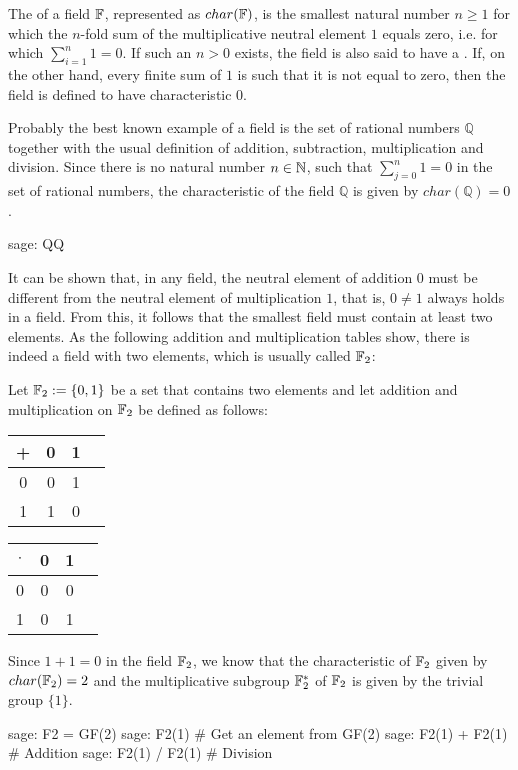 The  of a field $ \mathbb{F} $, represented as $char(\mathbb{F})$, is the smallest natural number $ n \geq 1 $ for which the $n$-fold sum of the multiplicative neutral element  $ 1 $ equals zero, i.e. for which $ \sum_{i = 1} ^ n 1 = 0 $. If such an $ n> 0 $ exists, the field is also said to have a . If, on the other hand, every finite sum of $1$ is such that it is not equal to zero, then the field is defined to have characteristic $ 0 $. 
\begin{example} Probably the best known example of a field is the set of rational numbers $\mathbb{Q}$ together with the usual definition of addition, subtraction, multiplication and division. Since there is no natural number $n\in \mathbb{N}$, such that $\sum_{j=0}^n 1 =0$ in the set of rational numbers, the characteristic of the field $\mathbb{Q}$ is given by $char(\mathbb{Q})=0$. 
\begin{sagecommandline}
sage: QQ
\end{sagecommandline}
\end{example}
\begin{example}\label{ex:field-2-elements} It can be shown that, in any field, the neutral element of addition $0$ must be different from the neutral element of multiplication $1$, that is, $0\neq 1$ always holds in a field. From this, it follows that the smallest field must contain at least two elements. As the following addition and multiplication tables show, there is indeed a field with two elements, which is usually called $\mathbb{F}_2$:

Let $\mathbb{F}_2:=\{0,1 \}$ be a set that contains two elements and let addition and multiplication on $\mathbb{F}_2$ be defined as follows:
\begin{center}
  \begin{tabular}{c | c c c}
    + & 0 & 1 \\\hline
    0 & 0 & 1\\
    1 & 1 & 0 \\
  \end{tabular} \quad \quad \quad \quad
  \begin{tabular}{c | c c c}
$\cdot$ & 0 & 1 \\\hline
      0 & 0 & 0 \\
      1 & 0 & 1 \\
  \end{tabular}
\end{center}
Since $1+1=0$ in the field $\mathbb{F}_2$, we know that the characteristic of $\mathbb{F}_2$ given by $char(\mathbb{F}_2)=2$ and the multiplicative subgroup $\mathbb{F}_2^*$ of $\mathbb{F}_2$ is given by the trivial group $\{1\}$.
\begin{sagecommandline}
sage: F2 = GF(2)
sage: F2(1) # Get an element from GF(2)
sage: F2(1) + F2(1) # Addition
sage: F2(1) / F2(1) # Division
\end{sagecommandline}
\end{example}
